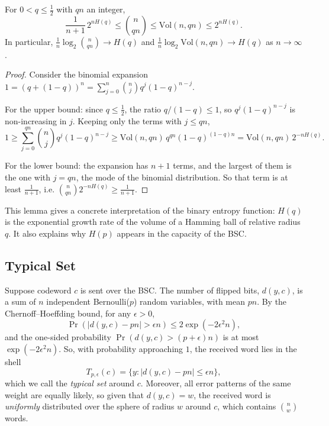 \begin{lemma}\label{lem:volume}
For \(0 < q \leq \frac{1}{2}\) with \(qn\) an integer,
\[\frac{1}{n+1}\, 2^{nH(q)} \leq \binom{n}{qn} \leq \mathrm{Vol}(n, qn) \leq 2^{nH(q)}.\]
In particular, \(\frac{1}{n}\log_2 \binom{n}{qn} \to H(q)\) and \(\frac{1}{n}\log_2 \mathrm{Vol}(n, qn) \to H(q)\) as \(n \to \infty\).
\end{lemma}
\begin{proof}
Consider the binomial expansion \(1 = (q + (1-q))^n = \sum_{j=0}^{n} \binom{n}{j} q^j (1-q)^{n-j}\).

For the upper bound: since \(q \leq \frac{1}{2}\), the ratio \(q/(1-q) \leq 1\), so \(q^j(1-q)^{n-j}\) is non-increasing in \(j\). Keeping only the terms with \(j \leq qn\),
\[1 \geq \sum_{j=0}^{qn} \binom{n}{j} q^j (1-q)^{n-j} \geq \mathrm{Vol}(n, qn)\, q^{qn}(1-q)^{(1-q)n} = \mathrm{Vol}(n, qn)\, 2^{-nH(q)}.\]

For the lower bound: the expansion has \(n+1\) terms, and the largest of them is the one with \(j = qn\), the mode of the binomial distribution. So that term is at least \(\frac{1}{n+1}\), i.e. \(\binom{n}{qn} 2^{-nH(q)} \geq \frac{1}{n+1}\).
\end{proof}

This lemma gives a concrete interpretation of the binary entropy function: \(H(q)\) is the exponential growth rate of the volume of a Hamming ball of relative radius \(q\). It also explains why \(H(p)\) appears in the capacity of the BSC.

\subsection{Typical Set}\label{sec:typical}
Suppose codeword \(c\) is sent over the BSC. The number of flipped bits, \(d(y, c)\), is a sum of \(n\) independent Bernoulli(\(p\)) random variables, with mean \(pn\). By the Chernoff--Hoeffding bound, for any \(\epsilon > 0\),
\[\Pr\left(|d(y, c) - pn| > \epsilon n\right) \leq 2\exp( - 2\epsilon^2 n),\]
and the one-sided probability \(\Pr(d(y,c) > (p+\epsilon)n)\) is at most \(\exp(-2\epsilon^2 n)\). So, with probability approaching \(1\), the received word lies in the shell
\[T_{p,\epsilon}(c) = \{y : |d(y,c) - pn| \leq \epsilon n\},\]
which we call the \emph{typical set} around \(c\). Moreover, all error patterns of the same weight are equally likely, so given that \(d(y,c) = w\), the received word is \emph{uniformly} distributed over the sphere of radius \(w\) around \(c\), which contains \(\binom{n}{w}\) words.


